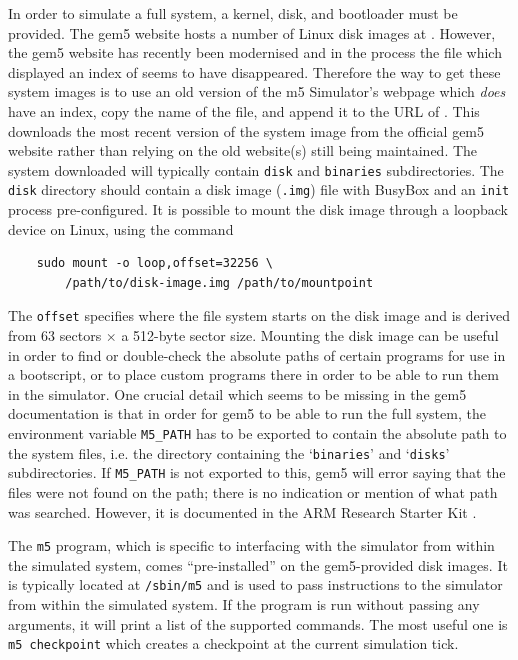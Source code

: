     In order to simulate a full system, a kernel, disk, and bootloader must be
    provided. The gem5 website hosts a number of Linux disk images at
    \cite{noauthor_index_2020}. However, the gem5 website has recently been 
    modernised and in the process the file which displayed an index of 
    \cite{noauthor_index_2020} seems to have disappeared. Therefore the way to 
    get these system images is to use an old version of the m5 Simulator's 
    webpage \cite{noauthor_index_2017} which \textit{does} have an index, copy 
    the name of the file, and append it to the URL of 
    \cite{noauthor_index_2020}. This downloads the most recent version of the 
    system image from the official gem5 website rather than relying on the old 
    website(s) still being maintained. The system downloaded will typically 
    contain \texttt{disk} and \texttt{binaries} subdirectories. The 
    \texttt{disk} directory should contain a disk image (\texttt{.img}) file 
    with BusyBox \cite{noauthor_busybox_nodate} and an \texttt{init} process 
    pre-configured. It is possible to mount the disk image through a loopback 
    device on Linux, using the command
    \begin{lstlisting}
    sudo mount -o loop,offset=32256 \
        /path/to/disk-image.img /path/to/mountpoint
    \end{lstlisting}
    The \texttt{offset} specifies where the file system starts on the disk 
    image and is derived from 63 sectors $\times$ a 512-byte sector size. 
    Mounting the disk image can be useful in order to find or double-check the 
    absolute paths of certain programs for use in a bootscript, or to place 
    custom programs there in order to be able to run them in the simulator. One 
    crucial detail which seems to be missing in the gem5 documentation is that 
    in order for gem5 to be able to run the full system, the environment 
    variable \texttt{M5\_PATH} has to be exported to contain the absolute path 
    to the system files, i.e. the directory containing the `\texttt{binaries}' 
    and `\texttt{disks}' subdirectories. If \texttt{M5\_PATH} is not exported 
    to this, gem5 will error saying that the files were not found on the path; 
    there is no indication or mention of what path was searched. However, it is 
    documented in the ARM Research Starter Kit \cite{tousi_arm_2017}.
    
    The \texttt{m5} program, which is specific to interfacing with the simulator
    from within the simulated system, comes ``pre-installed'' on the 
    gem5-provided disk images. It is typically located at \texttt{/sbin/m5} and 
    is used to pass instructions to the simulator from within the simulated 
    system. If the program is run without passing any arguments, it will print 
    a list of the supported commands. The most useful one is \texttt{m5 
    checkpoint} which creates a checkpoint at the current simulation tick.
    
